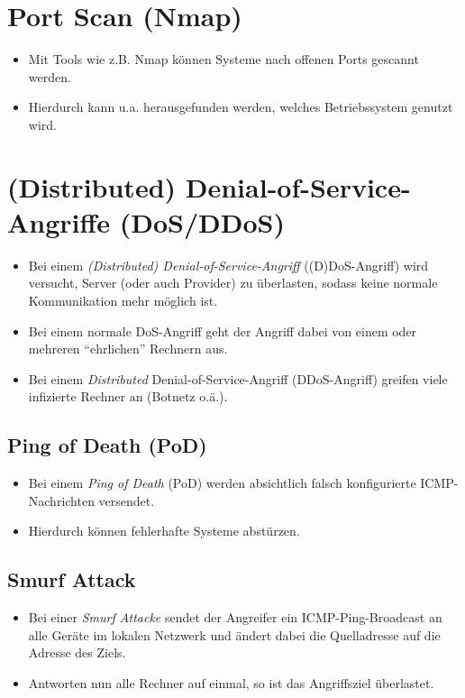 \documentclass[a4paper, 11pt, accentcolor = tud3b]{tudreport}
\begin{document}
        \section{Port Scan (Nmap)}
            \begin{itemize}
            	\item Mit Tools wie z.B. Nmap können Systeme nach offenen Ports gescannt werden.
            	\item Hierdurch kann u.a. herausgefunden werden, welches Betriebssystem genutzt wird.
            \end{itemize}

        \section{(Distributed) Denial-of-Service-Angriffe (DoS/DDoS)}
            \begin{itemize}
            	\item Bei einem \textit{(Distributed) Denial-of-Service-Angriff} ((D)DoS-Angriff) wird versucht, Server (oder auch Provider) zu überlasten, sodass keine normale Kommunikation mehr möglich ist.
            	\item Bei einem normale DoS-Angriff geht der Angriff dabei von einem oder mehreren \enquote{ehrlichen} Rechnern aus.
            	\item Bei einem \textit{Distributed} Denial-of-Service-Angriff (DDoS-Angriff) greifen viele infizierte Rechner an (Botnetz o.ä.).
            \end{itemize}

	        \subsection{Ping of Death (PoD)}
	            \begin{itemize}
	            	\item Bei einem \textit{Ping of Death} (PoD) werden absichtlich falsch konfigurierte ICMP-Nachrichten versendet.
	            	\item Hierdurch können fehlerhafte Systeme abstürzen.
	            \end{itemize}
	
	        \subsection{Smurf Attack}
	            \begin{itemize}
	            	\item Bei einer \textit{Smurf Attacke} sendet der Angreifer ein ICMP-Ping-Broadcast an alle Geräte im lokalen Netzwerk und ändert dabei die Quelladresse auf die Adresse des Ziels.
	            	\item Antworten nun alle Rechner auf einmal, so ist das Angriffsziel überlastet.
	            \end{itemize}
	        
\end{document}
